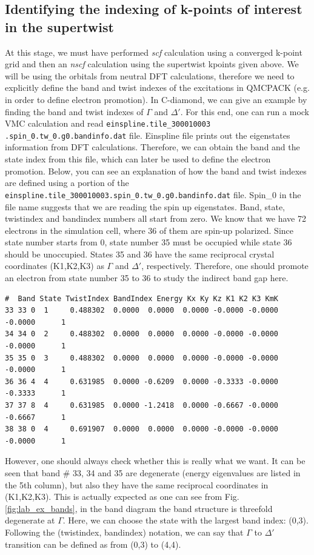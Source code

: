 \subsection{Identifying the indexing of k-points of interest in the supertwist}
At this stage, we must have performed \textit{scf} calculation using a converged k-point grid and then an \textit{nscf} calculation using the supertwist kpoints given above. 
We will be using the orbitals from neutral DFT calculations, therefore we need to explicitly define the band and twist indexes of the excitations in QMCPACK (e.g. in order to define electron promotion).
In C-diamond, we can give an example by finding the band and twist indexes of $\Gamma$ and $\Delta'$. 
For this end, one can run a mock VMC calculation and read \texttt{einspline.tile\_300010003} \texttt{.spin\_0.tw\_0.g0.bandinfo.dat} file. Einspline file prints out the eigenstates information from DFT calculations. 
Therefore, we can obtain the band and the state index from this file, which can later be used to define the electron promotion. 
Below, you can see an explanation of how the band and twist indexes are defined using a portion of the \texttt{einspline.tile\_300010003.spin\_0.tw\_0.g0.bandinfo.dat} file. 
Spin\_0 in the file name suggests that we are reading the spin up eigenstates. Band, state, twistindex and bandindex numbers all start from zero. We know that we have 72 electrons in the simulation cell, where 36 of them are spin-up polarized. 
Since state number starts from 0, state number 35 must be occupied while state 36 should be unoccupied. 
States 35 and 36 have the same reciprocal crystal coordinates (K1,K2,K3) as $\Gamma$ and $\Delta'$, respectively. 
Therefore, one should promote an electron from state number 35 to 36 to study the indirect band gap here. 
\begin{lstlisting}
#  Band State TwistIndex BandIndex Energy Kx Ky Kz K1 K2 K3 KmK
33 33 0  1     0.488302  0.0000  0.0000  0.0000 -0.0000 -0.0000 -0.0000      1
34 34 0  2     0.488302  0.0000  0.0000  0.0000 -0.0000 -0.0000 -0.0000      1
35 35 0  3     0.488302  0.0000  0.0000  0.0000 -0.0000 -0.0000 -0.0000      1
36 36 4  4     0.631985  0.0000 -0.6209  0.0000 -0.3333 -0.0000 -0.3333      1
37 37 8  4     0.631985  0.0000 -1.2418  0.0000 -0.6667 -0.0000 -0.6667      1
38 38 0  4     0.691907  0.0000  0.0000  0.0000 -0.0000 -0.0000 -0.0000      1
\end{lstlisting}
However, one should always check whether this is really what we want. 
It can be seen  that band \# 33, 34 and 35 are degenerate (energy eigenvalues are listed in the 5th column), but also they have the same reciprocal coordinates in (K1,K2,K3). 
This is actually expected as one can see from Fig. \ref{fig:lab_ex_bands}, in the band diagram the band structure is threefold degenerate at $\Gamma$.  
Here, we can choose the state with the largest band index: (0,3). 
Following the (twistindex, bandindex) notation, we can say that $\Gamma$ to $\Delta'$ transition can be defined as from (0,3) to (4,4). 

